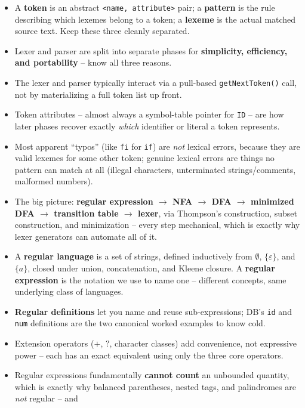 \documentclass[full-course-notes.tex]{subfiles}
\begin{document}
\begin{takeaways}
\begin{itemize}
  \item A \textbf{token} is an abstract \texttt{<name, attribute>} pair; a \textbf{pattern} is
  the rule describing which lexemes belong to a token; a \textbf{lexeme} is the actual matched
  source text. Keep these three cleanly separated.
  \item Lexer and parser are split into separate phases for \textbf{simplicity, efficiency, and
  portability} -- know all three reasons.
  \item The lexer and parser typically interact via a pull-based \texttt{getNextToken()} call,
  not by materializing a full token list up front.
  \item Token attributes -- almost always a symbol-table pointer for \texttt{ID} -- are how
  later phases recover exactly \emph{which} identifier or literal a token represents.
  \item Most apparent ``typos'' (like \texttt{fi} for \texttt{if}) are \emph{not} lexical errors,
  because they are valid lexemes for some other token; genuine lexical errors are things no
  pattern can match at all (illegal characters, unterminated strings/comments, malformed
  numbers).
  \item The big picture: \textbf{regular expression $\to$ NFA $\to$ DFA $\to$ minimized DFA
  $\to$ transition table $\to$ lexer}, via Thompson's construction, subset construction, and
  minimization -- every step mechanical, which is exactly why lexer generators can automate
  all of it.
  \item A \textbf{regular language} is a set of strings, defined inductively from $\emptyset$,
  $\{\varepsilon\}$, and $\{a\}$, closed under union, concatenation, and Kleene closure. A
  \textbf{regular expression} is the notation we use to name one -- different concepts, same
  underlying class of languages.
  \item \textbf{Regular definitions} let you name and reuse sub-expressions; DB's \texttt{id}
  and \texttt{num} definitions are the two canonical worked examples to know cold.
  \item Extension operators ($+$, $?$, character classes) add convenience, not expressive power
  -- each has an exact equivalent using only the three core operators.
  \item Regular expressions fundamentally \textbf{cannot count} an unbounded quantity, which is
  exactly why balanced parentheses, nested tags, and palindromes are \emph{not} regular -- and

\end{itemize}
\end{takeaways}
\end{document}
